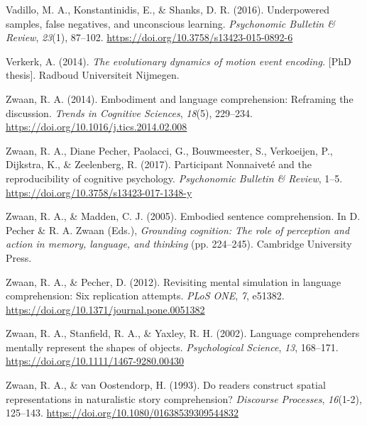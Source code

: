 \documentclass[
  man,floatsintext]{apa7}
\newlength{\cslhangindent}
\newlength{\cslentryspacingunit} %
\newenvironment{CSLReferences}[2] %
 {%
  \setlength{\parindent}{0pt}
  \ifodd #1
  \let\oldpar\par
  \def\par{\hangindent=\cslhangindent\oldpar}
  \fi
  \setlength{\parskip}{#2\cslentryspacingunit}
 }%
 {}
\begin{document}
\begin{CSLReferences}{1}{0}
\leavevmode{}%
Vadillo, M. A., Konstantinidis, E., \& Shanks, D. R. (2016). Underpowered samples, false negatives, and unconscious learning. \emph{Psychonomic Bulletin \& Review}, \emph{23}(1), 87--102. \url{https://doi.org/10.3758/s13423-015-0892-6}

\leavevmode{}%
Verkerk, A. (2014). \emph{The evolutionary dynamics of motion event encoding.} {[}PhD thesis{]}. Radboud Universiteit Nijmegen.

\leavevmode{}%
Zwaan, R. A. (2014). Embodiment and language comprehension: Reframing the discussion. \emph{Trends in Cognitive Sciences}, \emph{18}(5), 229--234. \url{https://doi.org/10.1016/j.tics.2014.02.008}

\leavevmode{}%
Zwaan, R. A., Diane Pecher, Paolacci, G., Bouwmeester, S., Verkoeijen, P., Dijkstra, K., \& Zeelenberg, R. (2017). Participant {Nonnaiveté} and the reproducibility of cognitive psychology. \emph{Psychonomic Bulletin \& Review}, 1--5. \url{https://doi.org/10.3758/s13423-017-1348-y}

\leavevmode{}%
Zwaan, R. A., \& Madden, C. J. (2005). Embodied sentence comprehension. In D. Pecher \& R. A. Zwaan (Eds.), \emph{Grounding cognition: {The} role of perception and action in memory, language, and thinking} (pp. 224--245). {Cambridge University Press}.

\leavevmode{}%
Zwaan, R. A., \& Pecher, D. (2012). Revisiting mental simulation in language comprehension: Six replication attempts. \emph{PLoS ONE}, \emph{7}, e51382. \url{https://doi.org/10.1371/journal.pone.0051382}

\leavevmode{}%
Zwaan, R. A., Stanfield, R. A., \& Yaxley, R. H. (2002). Language comprehenders mentally represent the shapes of objects. \emph{Psychological Science}, \emph{13}, 168--171. \url{https://doi.org/10.1111/1467-9280.00430}

\leavevmode{}%
Zwaan, R. A., \& van Oostendorp, H. (1993). Do readers construct spatial representations in naturalistic story comprehension? \emph{Discourse Processes}, \emph{16}(1-2), 125--143. \url{https://doi.org/10.1080/01638539309544832}

\end{CSLReferences}
\end{document}
